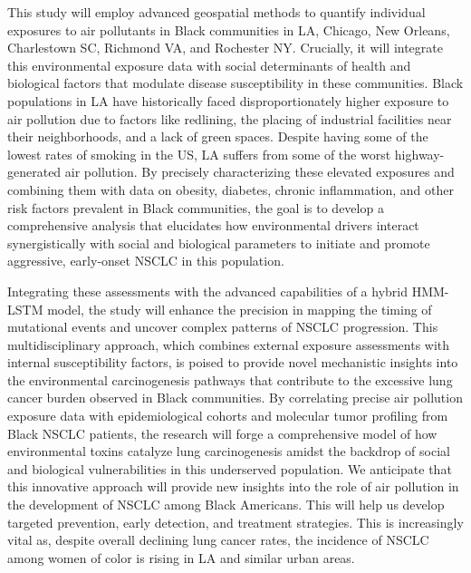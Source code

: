 This study will employ advanced geospatial methods to quantify individual exposures to air pollutants 
in Black communities in LA, Chicago, New Orleans, Charlestown SC, Richmond VA, and Rochester NY. 
Crucially, it will integrate this environmental exposure data with social determinants of health and biological factors 
that modulate disease susceptibility in these communities. 
Black populations in LA have historically faced disproportionately higher exposure to air pollution 
due to factors like redlining, the placing of industrial facilities near their neighborhoods, and a lack of green spaces. 
Despite having some of the lowest rates of smoking in the US, LA suffers from some of the worst highway-generated air pollution. 
By precisely characterizing these elevated exposures and combining them with data on 
obesity, diabetes, chronic inflammation, and other risk factors prevalent in Black communities, 
the goal is to develop a comprehensive analysis that elucidates how environmental drivers interact synergistically with 
social and biological parameters to initiate and promote aggressive, early-onset NSCLC in this population. 

Integrating these assessments with the advanced capabilities of a hybrid HMM-LSTM model, 
the study will enhance the precision in mapping the timing of mutational events and uncover complex patterns of NSCLC progression. 
This multidisciplinary approach, which combines external exposure assessments with internal susceptibility factors, 
is poised to provide novel mechanistic insights into the environmental carcinogenesis pathways 
that contribute to the excessive lung cancer burden observed in Black communities. 
By correlating precise air pollution exposure data with epidemiological cohorts and molecular tumor profiling from Black NSCLC patients, 
the research will forge a comprehensive model of how environmental toxins catalyze lung carcinogenesis 
amidst the backdrop of social and biological vulnerabilities in this underserved population. 
We anticipate that this innovative approach will provide new insights into the role of air pollution in 
the development of NSCLC among Black Americans. 
This will help us develop targeted prevention, early detection, and treatment strategies.
This is increasingly vital as, despite overall declining lung cancer rates, 
the incidence of NSCLC among women of color is rising in LA and similar urban areas. %

